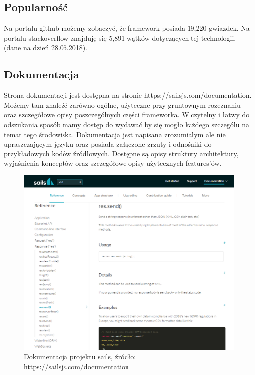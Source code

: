 \documentclass[12pt]{report}
\begin{document}
    \subsection{Popularność}
      Na portalu github możemy zobaczyć, że framework posiada 19,220 gwiazdek.
      Na portalu stackoverflow znajduję się 5,891 wątków dotyczących tej technologii.
      (dane na dzień 28.06.2018).

    \subsection{Dokumentacja}
      Strona dokumentacji jest dostępna na stronie https://sailsjs.com/documentation.
      Możemy tam znaleźć zarówno ogólne, użyteczne przy gruntownym rozeznaniu oraz szczegółowe opisy poszczególnych części frameworka.
      W czytelny i łatwy do odszukania sposób mamy dostęp do wydawać by się mogło każdego szczególu na temat tego środowiska.
      Dokumentacja jest napisana zrozumiałym ale nie upraszczającym języku oraz posiada załączone zrzuty i odnośniki do przykładowych kodów źródłowych.
      Dostępne są opisy struktury architektury, wyjaśnienia konceptów oraz szczegółowe opisy użytecznych features'ów.
      \begin{figure}[!hb]
        \centering
        \includegraphics[width=\textwidth,height=\textheight,keepaspectratio]{doc_sails.png} 
        \caption{Dokumentacja projektu sails, źródło: https://sailsjs.com/documentation}
      \end{figure}
\end{document}
